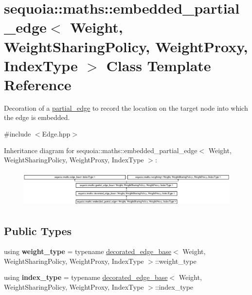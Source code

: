 \hypertarget{classsequoia_1_1maths_1_1embedded__partial__edge}{}\section{sequoia\+::maths\+::embedded\+\_\+partial\+\_\+edge$<$ Weight, Weight\+Sharing\+Policy, Weight\+Proxy, Index\+Type $>$ Class Template Reference}
\label{classsequoia_1_1maths_1_1embedded__partial__edge}


Decoration of a \mbox{\hyperlink{classsequoia_1_1maths_1_1partial__edge}{partial\+\_\+edge}} to record the location on the target node into which the edge is embedded.  




{\ttfamily \#include $<$Edge.\+hpp$>$}

Inheritance diagram for sequoia\+::maths\+::embedded\+\_\+partial\+\_\+edge$<$ Weight, Weight\+Sharing\+Policy, Weight\+Proxy, Index\+Type $>$\+:\begin{figure}[H]
\begin{center}
\leavevmode
\includegraphics[height=1.941074cm]{classsequoia_1_1maths_1_1embedded__partial__edge}
\end{center}
\end{figure}
\subsection*{Public Types}
\begin{DoxyCompactItemize}
\item 
\mbox{\label{classsequoia_1_1maths_1_1embedded__partial__edge_ab2c642be375005bfafa6a54f3426d6d6}} 
using {\bfseries weight\+\_\+type} = typename \mbox{\hyperlink{classsequoia_1_1maths_1_1decorated__edge__base}{decorated\+\_\+edge\+\_\+base}}$<$ Weight, Weight\+Sharing\+Policy, Weight\+Proxy, Index\+Type $>$\+::weight\+\_\+type
\item 
\mbox{\label{classsequoia_1_1maths_1_1embedded__partial__edge_a28293beb5eae5c06910814510a9a1df8}} 
using {\bfseries index\+\_\+type} = typename \mbox{\hyperlink{classsequoia_1_1maths_1_1decorated__edge__base}{decorated\+\_\+edge\+\_\+base}}$<$ Weight, Weight\+Sharing\+Policy, Weight\+Proxy, Index\+Type $>$\+::index\+\_\+type
\end{DoxyCompactItemize}
